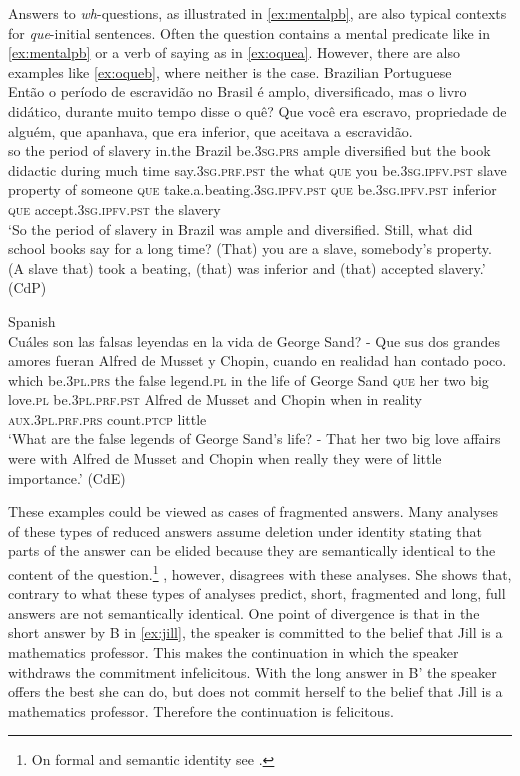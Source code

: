 Answers to \textit{wh}-questions,
as illustrated in \eqref{ex:mentalpb}, are also typical contexts for \emph{que}-initial sentences. Often the question contains a mental predicate like in \eqref{ex:mentalpb} or a verb of saying as in \eqref{ex:oquea}. However, there are also examples
like \eqref{ex:oqueb}, where neither is the case.
\ea \label{ex:oque}
\ea \label{ex:oquea} 
 Brazilian Portuguese \\
\gll 
		Então o período de escravidão no
Brasil é amplo, diversificado, mas o 
livro didático, durante muito tempo disse o quê? Que você era escravo, propriedade de alguém, que apanhava, que  era inferior, que aceitava a escravidão. \\
so the period of slavery in.the Brazil be.\textsc{3sg.prs} ample diversified
but the
book didactic during much time say.\textsc{3sg.prf.pst} the what \textsc{que} you be.\textsc{3sg.ipfv.pst} slave property of someone \textsc{que} {take.a.beating}.\textsc{3sg.ipfv.pst} \textsc{que} be.\textsc{3sg.ipfv.pst}  inferior \textsc{que} accept.\textsc{3sg.ipfv.pst}  the slavery
\\
\glt `So the period of slavery in Brazil was ample and diversified. Still, what did school
books say for a long time? (That) you are a slave, somebody’s property. (A slave
that) took a beating, (that) was inferior and (that) accepted slavery.' (CdP)

\ex \label{ex:oqueb}
 Spanish\\ 
\gll  Cuáles son las falsas leyendas en la vida de George Sand? - Que sus dos grandes amores fueran Alfred de Musset y Chopin, cuando en realidad han
contado poco. \\
which be.\textsc{3pl.prs} the false legend.\textsc{pl} in the life of George Sand {} \textsc{que} her two
big love.\textsc{pl} be.\textsc{3pl.prf.pst}  Alfred de Musset and Chopin when in reality \textsc{aux.3pl.prf.prs} count.\textsc{ptcp} little\\
\glt `What are the false legends of George Sand’s life? - That her two big love affairs
were with Alfred de Musset and Chopin when really they were of little importance.' (CdE)
	\z
\z


These examples could be viewed as cases of fragmented answers. Many analyses of these
 types of reduced answers assume deletion under identity stating that parts of the
answer can be elided because they are semantically identical to the content of the question.\footnote{On formal and semantic identity see \citet[353--356]{Jacobson2016}.}
\citet{Jacobson2016}, however, disagrees with these analyses. She shows that, contrary to what these types of analyses predict, short, fragmented and long, full answers are not semantically identical.
 One point of divergence is that in the short answer by B in \eqref{ex:jill}, the speaker is committed
to the belief that Jill is a mathematics professor. This makes the continuation in which the
speaker withdraws the commitment infelicitous. With the long answer in B’ the speaker offers
the best she can do, but does not commit herself to the belief that Jill is a mathematics
professor. Therefore the continuation is felicitous.

